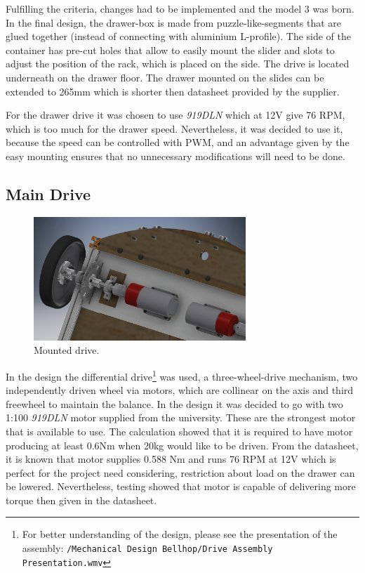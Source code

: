 \documentclass[11pt]{article}
\begin{document}
Fulfilling the criteria, changes had to be implemented and the model 3 was born. In the final design, the drawer-box is made from puzzle-like-segments that are glued together (instead of connecting with aluminium L-profile). The side of the container has pre-cut holes that allow to easily mount the slider and slots to adjust the position of the rack, which is placed on the side. The drive is located underneath on the drawer floor. The drawer mounted on the slides can be extended to 265mm which is shorter then datasheet provided by the supplier.


For the drawer drive it was chosen to use \textit{919DLN} which at 12V give 76 RPM, which is too much for the drawer speed. Nevertheless, it was decided to use it, because the speed can be controlled with PWM, and an advantage given by the easy mounting ensures that no unnecessary modifications will need to be done.

\subsection*{Main Drive}

\begin{figure}
  \includegraphics[width=8cm]{maindrive}
  \caption{Mounted drive.}
  \label{profile}
\end{figure}

In the design the differential drive\footnote{For better understanding of the design, please see the presentation of the assembly: \texttt{/Mechanical Design Bellhop/Drive Assembly Presentation.wmv}} was used, a three-wheel-drive mechanism, two independently driven wheel via motors, which are collinear on the axis and third freewheel to maintain the balance. In the design it was decided to go with two 1:100 \textit{919DLN} motor supplied from the university. These are the strongest motor that is available to use. The calculation showed that it is required to have motor producing at least 0.6Nm when 20kg would like to be driven. From the datasheet, it is known that motor supplies 0.588 Nm and runs 76 RPM at 12V which is perfect for the project need considering, restriction about load on the drawer can be lowered. Nevertheless, testing showed that motor is capable of delivering more torque then given in the datasheet.
\end{document}
